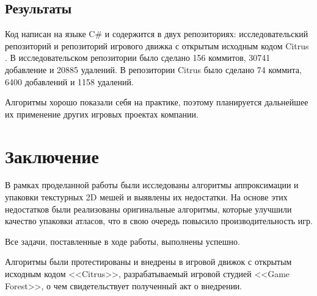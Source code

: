 \documentclass{fefu_thesis/cls/fefu}
\begin{document}
    \subsection{Результаты}

    Код написан на языке C\# и содержится в двух репозиториях: исследовательский репозиторий \cite{PolypackGithub} и репозиторий игрового движка с открытым исходным кодом Citrus \cite{CitrusGithub}. В исследовательском репозитории было сделано 156 коммитов, 30741 добавление и 20885 удалений. В репозитории Citrus было сделано 74 коммита, 6400 добавлений и 1158 удалений.

    Алгоритмы хорошо показали себя на практике, поэтому планируется дальнейшее их применение других игровых проектах компании.

    \pagebreak
    \section*{Заключение}

    В рамках проделанной работы были исследованы алгоритмы аппроксимации и упаковки текстурных 2D мешей и выявлены их недостатки. На основе этих недостатков были реализованы оригинальные алгоритмы, которые улучшили качество упаковки атласов, что в свою очередь повысило производительность игр.

    Все задачи, поставленные в ходе работы, выполнены успешно.

    Алгоритмы были протестированы и внедрены в игровой движок с открытым исходным кодом <<Citrus>>, разрабатываемый игровой студией <<Game Forest>>, о чем свидетельствует полученный акт о внедрении.

    \newpage
    \printbibliography
\end{document}
